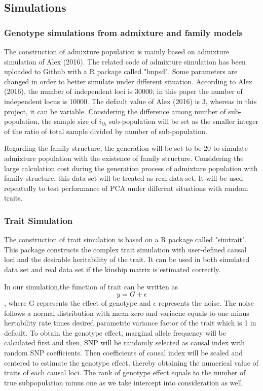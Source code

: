 \documentclass[12pt]{article}
\begin{document}
\subsection{Simulations}

\subsubsection{Genotype simulations from admixture and family models}

The construction of admixture population is mainly based on admixture simulation of Alex (2016).
The related code of admixture simulation has been uploaded to Github with a R package called "bnpsd".
Some parameters are changed in order to better simulate under different situation.
According to Alex (2016), the number of independent loci is 30000, in this paper the number of independent locus is 10000.
The default value of Alex (2016) is 3, whereas in this project, it can be variable.
Considering the difference among number of sub-population, the sample size of $i_{th}$ sub-population will be set as the smaller integer of the ratio of total sample divided by number of sub-population.

Regarding the family structure, the generation will be set to be 20 to simulate admixture population with the existence of family structure.
Considering the large calculation cost during the generation process of admixture population with family structure, this data set will be treated as real data set.
It will be used repeatedly to test performance of PCA under different situations with random traits.

\subsubsection{Trait Simulation}

The construction of trait simulation is based on a R package called "simtrait".
This package constructs the complex trait simulation with user-defined causal loci and the desirable heritability of the trait.
It can be used in both simulated data set and real data set if the kinship matrix is estimated correctly.

In our simulation,the function of trait can be written as $$y=G+ \epsilon$$ 
, where G represents the effect of genotype and $\epsilon$ represents the noise.
The noise follows a normal distribution with mean zero and variacne equals to one minus hertability rate times desired parametric variance factor of the trait which is 1 in default.
To obtain the genotype effect, marginal allele frequency will be calculated first and then, SNP will be randomly selected as causal index with random SNP coefficients.
Then  coefficients of causal index will be scaled and centered to estimate the genotype effect, thereby obtaining the numerical value of traits of each causal loci.
The rank of genotype effect equals to the number of true subpopulation minus one as we take intercept into consideration as well.  
\end{document}
